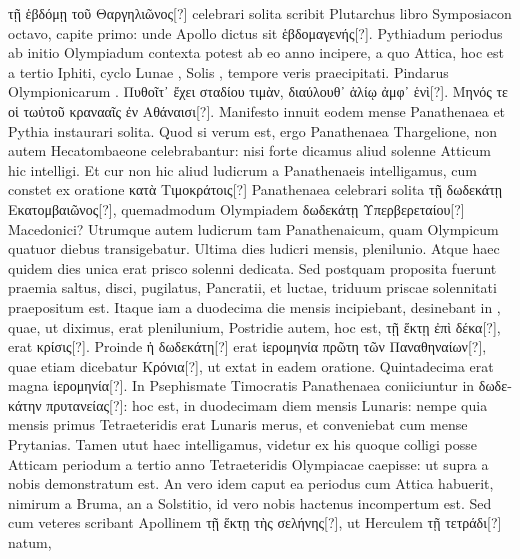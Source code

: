  \textgreek{τῇ ἑβδόμῃ τοῦ Θαργηλιῶνος[?]} celebrari solita
scribit Plutarchus libro Symposiacon octavo, capite primo: unde
Apollo dictus sit \textgreek{ἑβδομαγενής[?]}.
Pythiadum periodus ab initio Olympiadum
contexta potest ab eo anno incipere, a quo Attica, hoc est a
tertio Iphiti, cyclo Lunae ,
 Solis , tempore veris praecipitati.
Pindarus Olympionicarum .
\textgreek{Πυθοῖτ᾽ ἔχει σταδίου τιμὰν, διαύλουθ᾽ ἁλίῳ
ἀμφ᾽ ἑνὶ[?]}.
\textgreek{Μηνός τε οἱ τωὐτοῦ κρανααῖς ἐν Αθάναισι[?]}.
Manifesto innuit eodem
mense Panathenaea et Pythia instaurari solita.
Quod si verum
est, ergo Panathenaea Thargelione, non autem Hecatombaeone celebrabantur:
nisi forte dicamus aliud solenne Atticum hic intelligi.
Et cur non hic aliud ludicrum a Panathenaeis intelligamus, cum constet
ex oratione \textgreek{κατὰ Τιμοκράτοις[?]} Panathenaea celebrari solita
 \textgreek{τῇ δωδεκάτῃ
Εκατομβαιῶνος[?]},
quemadmodum Olympiadem \textgreek{δωδεκάτῃ Υπερβερεταίου[?]} Macedonici?
%
Utrumque autem ludicrum tam Panathenaicum,
quam Olympicum quatuor diebus transigebatur.
Ultima dies ludicri
 mensis, plenilunio.
Atque haec quidem dies unica erat prisco solenni
dedicata.
Sed postquam proposita fuerunt praemia saltus, disci,
pugilatus, Pancratii, et luctae, triduum priscae solennitati praepositum
est.
Itaque iam a duodecima die mensis incipiebant, desinebant
in , quae, ut diximus, erat  plenilunium, Postridie autem, hoc
est, \textgreek{τῇ ἕκτῃ ἐπὶ δέκα[?]}, erat \textgreek{κρίσις[?]}.
Proinde \textgreek{ἡ δωδεκάτη[?]} erat \textgreek{ἱερομηνία πρῶτη
τῶν Παναθηναίων[?]}, quae etiam dicebatur \textgreek{Κρόνια[?]},
 ut extat in eadem
oratione.
Quintadecima erat magna \textgreek{ἱερομηνία[?]}.
In Psephismate Timocratis
Panathenaea coniiciuntur in \textgreek{δωδεκάτην πρυτανείας[?]}: hoc est, in
duodecimam diem mensis Lunaris: nempe quia mensis primus Tetraeteridis
erat Lunaris merus, et conveniebat cum mense Prytanias.
Tamen utut haec intelligamus, videtur ex his quoque colligi posse
Atticam periodum a tertio anno Tetraeteridis Olympiacae caepisse:
ut supra a nobis demonstratum est.
An vero idem caput ea periodus
cum Attica habuerit, nimirum a Bruma, an a Solstitio, id vero nobis
hactenus incompertum est.
Sed cum veteres scribant Apollinem
\textgreek{τῇ ἕκτῃ τὴς σελήνης[?]}, ut Herculem \textgreek{τῇ τετράδι[?]} natum,
